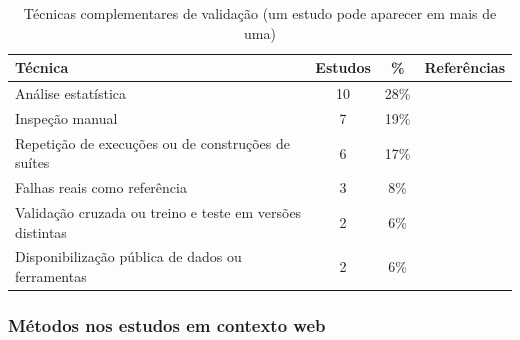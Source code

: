 \begin{table}[H]
    \centering
    \scriptsize
    \caption{Técnicas complementares de validação (um estudo pode aparecer em mais de uma)}
    \label{tab:tecnicas-complementares}
    \begin{tabular}{|p{3.2cm}|c|c|p{7.5cm}|}
        \hline
        \textbf{Técnica} & \textbf{Estudos} & \textbf{\%} & \textbf{Referências} \\
        \hline
        Análise estatística & 10 & 28\% & \cite{yao2014, petrovic2021, kurtz2016, just2014, grano2019, arasteh2023, ashong2026, guizzo2022, ahmed2016, khanfir2023} \\
        \hline
        Inspeção manual & 7 & 19\% & \cite{yao2014, yandrapally2021, petrovic2021, just2014, guerino2024, esterobotaro2010, kuroishi2020} \\
        \hline
        Repetição de execuções ou de construções de suítes & 6 & 17\% & \cite{zhang2010, kurtz2016, arasteh2022, arasteh2023, guizzo2022, ashong2026} \\
        \hline
        Falhas reais como referência & 3 & 8\% & \cite{just2014, khanfir2023, petrovic2021} \\
        \hline
        Validação cruzada ou treino e teste em versões distintas & 2 & 6\% & \cite{jalbert2012, zhang2019} \\
        \hline
        Disponibilização pública de dados ou ferramentas & 2 & 6\% & \cite{yandrapally2021, ashong2026} \\
        \hline
    \end{tabular}
\end{table}

\subsubsection{Métodos nos estudos em contexto web}
\label{subsubsec:validacao-web}

